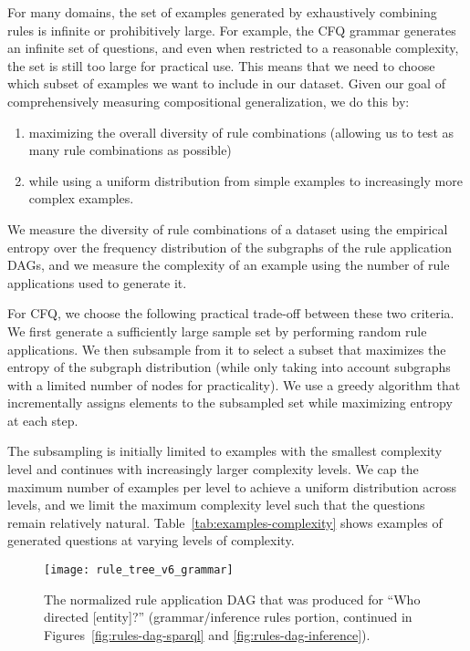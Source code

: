 \documentclass[letterpaper]{article}
\begin{document}
For many domains, the set of examples generated by exhaustively combining rules is infinite or prohibitively large.
For example, the CFQ grammar generates an infinite set of questions, and even when restricted to a reasonable complexity, the set is still too large for practical use.
This means that we need to choose which subset of examples we want to include in our dataset. Given our goal of comprehensively measuring compositional generalization, we do this by:

\begin{enumerate}
    \item maximizing the overall diversity of rule combinations (allowing us to test as many rule combinations as possible)
    \item while using a uniform distribution from simple examples to increasingly more complex examples.
\end{enumerate}

We measure the diversity of rule combinations of a dataset using the empirical entropy over the frequency distribution of the subgraphs of the rule application DAGs, and we measure the complexity of an example using the number of rule applications used to generate it.

For CFQ, we choose the following practical trade-off between these two criteria.
We first generate a sufficiently large sample set by performing random rule applications. We then subsample from it to select a subset that maximizes the entropy of the subgraph distribution (while only taking into account subgraphs with a limited number of nodes for practicality).
We use a greedy algorithm that incrementally assigns elements to the subsampled set while maximizing entropy at each step.

The subsampling is initially limited to examples with the smallest complexity level and continues with increasingly larger complexity levels. We cap the maximum number of examples per level to achieve a uniform distribution across levels, and we limit the maximum complexity level such that the questions remain relatively natural.
Table~\ref{tab:examples-complexity} shows examples of generated questions at varying levels of complexity.

\begin{figure*}
  \centering
  \texttt{[image: rule\_tree\_v6\_grammar]}
  \caption{The normalized rule application DAG that was produced for ``Who directed [entity]?'' (grammar/inference rules portion, continued in Figures~\ref{fig:rules-dag-sparql} and  \ref{fig:rules-dag-inference}).}
  \label{fig:rules-dag-grammar}
\end{figure*}
\end{document}
